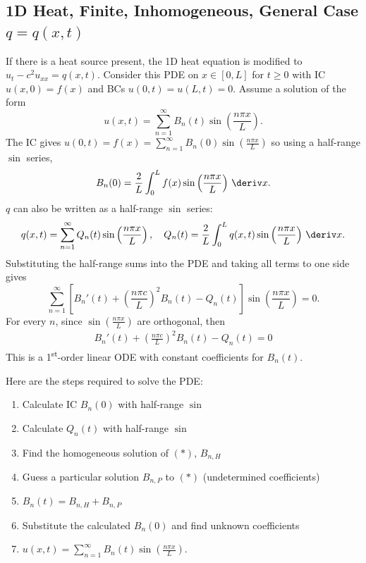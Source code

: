 \documentclass[10pt, a4paper]{article}
\begin{document}
\begin{landscape}
\begin{multicols*}{2}
    \section{1D Heat, Finite, Inhomogeneous, General Case \texorpdfstring{\(q = q(x, t)\)}{q = q(x, t)}}

    If there is a heat source present, the 1D heat equation is modified to \(u_t - c^2 u_{xx} = q(x, t)\).
    Consider this PDE on \(x \in [0, L]\) for \(t \geq 0\) with IC \(u(x, 0) = f(x)\) and BCs \(u(0, t) = u(L, t) = 0\).
    Assume a solution of the form
    \[u(x, t) = \sum_{n=1}^{\infty} B_{n}(t) \sin\left(\frac{n \pi x}{L}\right).\]
    The IC gives
    \(u(0, t) = f(x) = \sum_{n=1}^{\infty} B_{n}(0) \sin\left(\frac{n \pi x}{L}\right)\)
    so using a half-range \(\sin\) series,
    \[B_{n}(0) = \frac{2}{L} \int_{0}^{L} f(x) \sin\left(\frac{n \pi x}{L}\right) \,\deriv x.\]
    \(q\) can also be written as a half-range \(\sin\) series:
    \[
        q(x, t) = \sum_{n=1}^{\infty} Q_{n}(t) \sin \left(\frac{n \pi x}{L}\right),
        \quad
        Q_{n}(t) = \frac{2}{L} \int_{0}^{L} q(x, t) \sin \left(\frac{n \pi x}{L}\right) \,\deriv x.
    \]
    Substituting the half-range sums into the PDE and taking all terms to one side gives
    \[
        \sum_{n=1}^{\infty} \left[
            B_{n}'(t) + \left(\frac{n \pi c}{L}\right)^{2} B_{n}(t) - Q_{n}(t)
        \right] \sin \left(\frac{n \pi x}{L}\right) = 0.
    \]
    For every \(n\), since \(\sin \left(\frac{n \pi x}{L}\right)\) are orthogonal, then
    \begin{align*}
        B_{n}'(t) + \left(\frac{n \pi c}{L}\right)^{2} B_{n}(t) - Q_{n}(t) = 0  \tag{\(*\)}
    \end{align*}
    This is a 1\textsuperscript{st}-order linear ODE with constant coefficients for \(B_{n}(t)\).
    
    Here are the steps required to solve the PDE:
    \begin{enumerate}
        \item Calculate IC \(B_{n}(0)\) with half-range \(\sin\)
        \item Calculate \(Q_n(t)\) with half-range \(\sin\)
        \item Find the homogeneous solution of \((*)\), \(B_{n, H}\)
        \item Guess a particular solution \(B_{n, P}\) to \((*)\) (undetermined coefficients)
        \item \(B_{n}(t) = B_{n,H} + B_{n,P}\)
        \item Substitute the calculated \(B_{n}(0)\) and find unknown coefficients
        \item \(u(x, t) = \sum_{n=1}^{\infty} B_{n}(t) \sin \left(\frac{n \pi x}{L}\right)\).
    \end{enumerate}


\end{multicols*}
\end{landscape}
\end{document}
